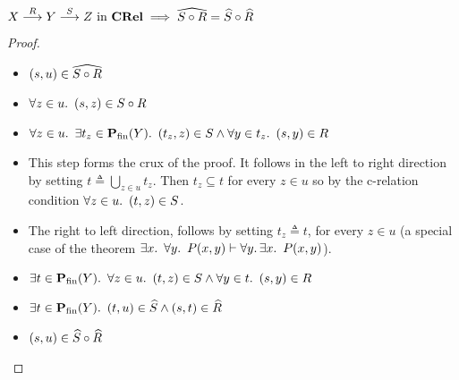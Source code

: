 \begin{prop}\label{prop:rel-hat-comp}
  $X\overset{R}{\longrightarrow}Y\overset{S}{\longrightarrow}Z\text{ in }\mathbf{CRel}\implies\widehat{S\circ R} = \widehat{S}\circ\widehat{R}$
  \begin{proof}~\\
    \begin{itemize}
      \item[\phantom{\imps}]
        $(s,u)\in\widehat{S\circ R}$
        \marginnote{\Hyp}

      \item[\iffs]
        $\forall z\in u\ldotp~(s,z)\in S\circ R$

      \item[\iffs]
        $\forall z\in u\ldotp~\exists t_z\in\mathbf{P}_{\operatorname{fin}}(Y)\ldotp~(t_z,z)\in S\land\forall y\in t_z\ldotp~(s,y)\in R$

        \addtolength{\itemsep}{\baselineskip}
        \item[\phantom{\imps}]
          This step forms the crux of the proof. It follows in the left to right direction by setting $t \triangleq \bigcup\limits_{z\in u} t_z$. Then $t_z\subseteq t$ for every $z\in u$ so by the c-relation condition $\forall z\in u\ldotp~(t,z)\in S$.

        \item[\phantom{\imps}]
          The right to left direction, follows by setting $t_z \triangleq t$, for every ${z\in u}$ (a special case of the theorem ${\exists x\ldotp~\forall y\ldotp~P(x, y)\vdash\forall y\ldotp\exists x\ldotp~P(x,y)}$).

      \item[\iffs]
        $\exists t\in\mathbf{P}_{\operatorname{fin}}(Y)\ldotp~\forall z\in u\ldotp~(t,z)\in S\land\forall y\in t\ldotp~(s,y)\in R$

        \addtolength{\itemsep}{-1\baselineskip}
      \item[\iffs]
        $\exists t\in\mathbf{P}_{\operatorname{fin}}(Y)\ldotp~(t,u)\in\widehat{S}\land (s,t)\in\widehat{R}$

      \item[\iffs]
        $(s, u)\in\widehat{S}\circ\widehat{R}$
        \qedhere

    \end{itemize}
  \end{proof}
\end{prop}

